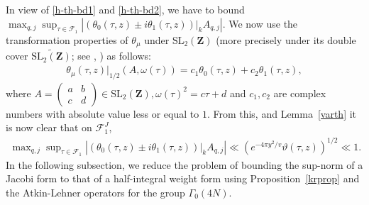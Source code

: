 \documentclass[11pt]{amsart}
\numberwithin{equation}{section}
\theoremstyle{plain}
\theoremstyle{definition}
\newcommand{\lemref}[1]{Lemma~\ref{#1}}
\newcommand{\propref}[1]{Proposition~\ref{#1}}
\newcommand{\mf}{\mathbf}
\newcommand{\mc}{\mathcal}
\newcommand{\mrm}{\mathrm}
\newcommand{\psmb}{\left( \begin{smallmatrix}}
\newcommand{\psme}{ \end{smallmatrix} \right) }
\newcommand{\sltwo}{\mrm{SL}_2(\mf Z)}
\begin{document}
In view of \eqref{h-th-bd1} and \eqref{h-th-bd2}, we have to bound
$\displaystyle \max \nolimits_{q,j} \sup \nolimits_{\tau \in \mc F_1} \left|(\theta_{0}(\tau,z) \pm i \theta_{1}(\tau,z) ) |_{k} A_{q,j}\right| $.
We now use the transformation properties of $\theta_{\mu}$ under $\sltwo$ (more precisely under its double cover $\widetilde{\sltwo}$; see \cite{Kr}, \cite{Sko}) as follows:
\begin{align}
\theta_{\mu}(\tau,z) |_{1/2} (A, \omega(\tau)) = c_1 \theta_{0}(\tau,z)  + c_2 \theta_{1}(\tau,z), 
\end{align}
where $A=\psmb a & b \\ c & d \psme \in \sltwo, \omega(\tau)^2=c\tau+d$ and $c_1,c_2$ are complex numbers with absolute value less or equal to $1$. From this, and \lemref{varth} it is now clear that on $\mc F_1^J$,
\begin{align} \label{th-bd}
    \max \nolimits_{q,j} \sup \nolimits_{\tau \in \mc F_1} \left|(\theta_{0}(\tau,z) \pm i \theta_{1}(\tau,z) ) |_{k} A_{q,j}\right| \ll \left( e^{- 4 \pi y^2/v} \vartheta(\tau,z) \right)^{1/2} \ll 1.
\end{align}
In the following subsection, we reduce the problem of bounding the sup-norm of a Jacobi form to that of a half-integral weight form using \propref{krprop} and the Atkin-Lehner operators for the group $\Gamma_0(4N)$.
\end{document}
